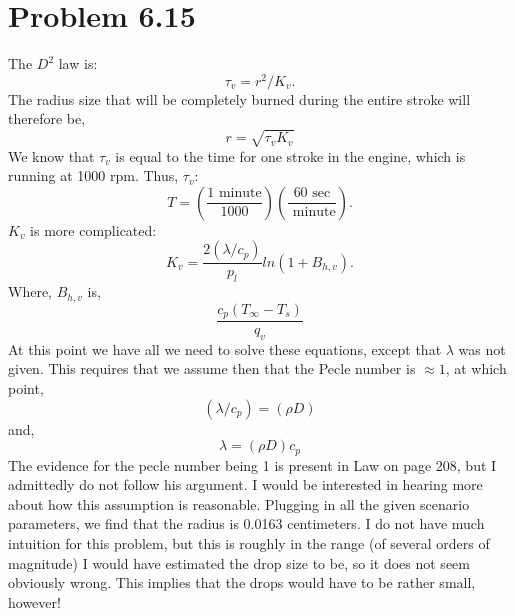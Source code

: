 \documentclass{article}
\begin{document}
\section*{Problem 6.15}

The $D^2$ law is:
\begin{equation}
 \tau_v = r^2/ K_v.
\end{equation}
The radius size that will be completely burned during the entire stroke
will therefore be, 
\begin{equation}
 r = \sqrt{\tau_v K_v}
\end{equation}
We know that $\tau_v$ is equal to the time for one stroke in the engine,
which is running at 1000 rpm. Thus, $\tau_v$:
\begin{equation}
T = \left(\frac{1 \text{ minute}}{1000}\right) \left(\frac{60
     \text{ sec}}{\text{ minute}}\right).
\end{equation}
$K_v$ is more complicated:
\begin{equation}
K_v = \frac{2 (\lambda/c_p)}{p_l} ln(1+B_{h,v}).
\end{equation}
Where, $B_{h,v}$ is, 
\begin{equation}
\frac{c_p (T_\infty - T_s)}{q_v}
\end{equation}
At this point we have all we need to solve these equations, except that
$\lambda$ was not given. This requires that we assume then that the
Pecle number is $\approx 1$, at which point,
\begin{equation}
(\lambda/c_p) = (\rho D)
\end{equation}
and,
\begin{equation}
 \lambda = (\rho D)c_p
\end{equation}
The evidence for the pecle number being 1 is present in Law on page 208,
but I admittedly do not follow his argument. I would be interested in
hearing more about how this assumption is reasonable.
\newline
Plugging in all the given scenario parameters, we find that the radius
is 0.0163 centimeters. I do not have much intuition for this problem,
but this is roughly in the range (of several orders of magnitude) I
would have estimated the drop size to be, so it does not seem obviously
wrong. This implies that the drops would have to be rather small, however! 
\end{document}
